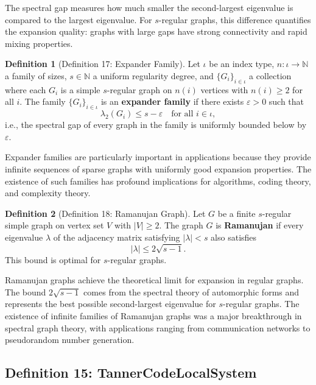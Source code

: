 \documentclass[11pt]{article}
\theoremstyle{plain}
\theoremstyle{definition}
\newtheorem*{definition}{Definition}
\theoremstyle{remark}
\begin{document}
The spectral gap measures how much smaller the second-largest eigenvalue is compared to the largest eigenvalue. For $s$-regular graphs, this difference quantifies the expansion quality: graphs with large gaps have strong connectivity and rapid mixing properties.

\begin{definition}[Definition 17: Expander Family]
Let $\iota$ be an index type, $n : \iota \to \mathbb{N}$ a family of sizes, $s \in \mathbb{N}$ a uniform regularity degree, and $\{G_i\}_{i \in \iota}$ a collection where each $G_i$ is a simple $s$-regular graph on $n(i)$ vertices with $n(i) \geq 2$ for all $i$. The family $\{G_i\}_{i \in \iota}$ is an \textbf{expander family} if there exists $\varepsilon > 0$ such that
\[
\lambda_2(G_i) \leq s - \varepsilon \quad \text{for all } i \in \iota,
\]
i.e., the spectral gap of every graph in the family is uniformly bounded below by $\varepsilon$.
\end{definition}

Expander families are particularly important in applications because they provide infinite sequences of sparse graphs with uniformly good expansion properties. The existence of such families has profound implications for algorithms, coding theory, and complexity theory.

\begin{definition}[Definition 18: Ramanujan Graph]
Let $G$ be a finite $s$-regular simple graph on vertex set $V$ with $|V| \geq 2$. The graph $G$ is \textbf{Ramanujan} if every eigenvalue $\lambda$ of the adjacency matrix satisfying $|\lambda| < s$ also satisfies
\[
|\lambda| \leq 2\sqrt{s-1}.
\]
This bound is optimal for $s$-regular graphs.
\end{definition}

Ramanujan graphs achieve the theoretical limit for expansion in regular graphs. The bound $2\sqrt{s-1}$ comes from the spectral theory of automorphic forms and represents the best possible second-largest eigenvalue for $s$-regular graphs. The existence of infinite families of Ramanujan graphs was a major breakthrough in spectral graph theory, with applications ranging from communication networks to pseudorandom number generation.

\vspace{1em}

\subsection{Definition 15: TannerCodeLocalSystem}
\end{document}
